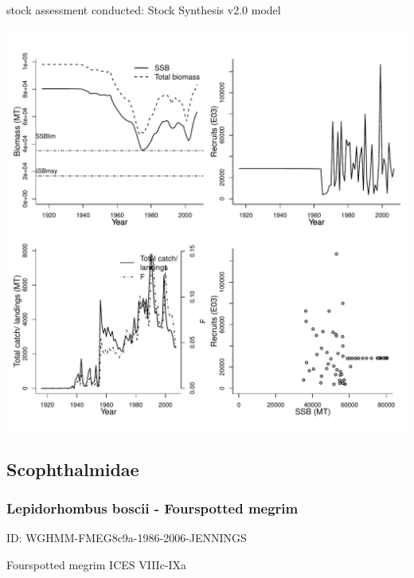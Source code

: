 stock assessment conducted: Stock Synthesis v2.0 model 
\begin{center}
\vspace{-0.2cm}\includegraphics[scale=0.65]{../tex/figures/plot-NWFSC-ARFLOUNDPCOAST-1916-2007-BRANCH.pdf}
\end{center}

\newpage
\subsection{Scophthalmidae}

\subsubsection{Lepidorhombus boscii - Fourspotted megrim}
ID: WGHMM-FMEG8c9a-1986-2006-JENNINGS

Fourspotted megrim ICES VIIIc-IXa 

